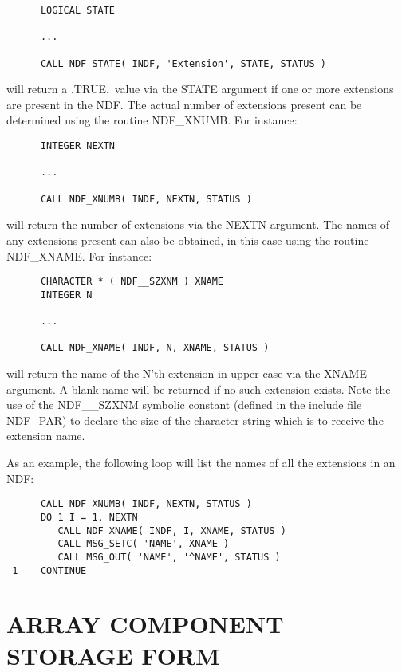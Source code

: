 \documentclass[twoside,11pt]{article}
\newcommand{\htmlref}[2]{#1}
\newcommand{\xlabel}[1]{}
\begin{document}
\small
\begin{verbatim}
      LOGICAL STATE

      ...

      CALL NDF_STATE( INDF, 'Extension', STATE, STATUS )
\end{verbatim}
\normalsize

will return a .TRUE.\ value via the STATE argument if one or more extensions 
are present in the NDF.
The actual number of extensions present can be determined using the routine
\htmlref{NDF\_XNUMB}{NDF_XNUMB}. 
For instance:

\small
\begin{verbatim}
      INTEGER NEXTN

      ...

      CALL NDF_XNUMB( INDF, NEXTN, STATUS )
\end{verbatim}
\normalsize

will return the number of extensions via the NEXTN argument.
The names of any extensions present can also be obtained, in this case 
using the routine \htmlref{NDF\_XNAME}{NDF_XNAME}.
For instance:

\small
\begin{verbatim}
      CHARACTER * ( NDF__SZXNM ) XNAME
      INTEGER N

      ...

      CALL NDF_XNAME( INDF, N, XNAME, STATUS )
\end{verbatim}
\normalsize

will return the name of the N'th extension in upper-case via the XNAME
argument. 
A blank name will be returned if no such extension exists. 
Note the use of the NDF\_\_SZXNM symbolic constant (defined in the include
file NDF\_PAR) to declare the size of the character string which is to
receive the extension name. 

As an example, the following loop will list the names of all the extensions
in an NDF: 

\small
\begin{verbatim}
      CALL NDF_XNUMB( INDF, NEXTN, STATUS )
      DO 1 I = 1, NEXTN
         CALL NDF_XNAME( INDF, I, XNAME, STATUS )
         CALL MSG_SETC( 'NAME', XNAME )
         CALL MSG_OUT( 'NAME', '^NAME', STATUS )
 1    CONTINUE
\end{verbatim}
\normalsize


\section{\xlabel{array_component_storage_form}\label{ss:storageform}ARRAY COMPONENT STORAGE FORM}
\end{document}
